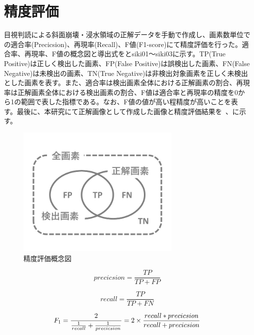 \documentclass[../Thesis]{subfiles}
\begin{document}
\section{精度評価}
目視判読による斜面崩壊・浸水領域の正解データを手動で作成し、画素数単位での適合率(Precicsion)、再現率(Recall)、F値(F1-score)にて精度評価を行った。適合率、再現率、F値の概念図と導出式をとsiki{01}～siki{03}に示す。TP(True Positive)は正しく検出した画素、FP(False Positive)は誤検出した画素、FN(False Negative)は未検出の画素、TN(True Negative)は非検出対象画素を正しく未検出とした画素を表す。また、適合率は検出画素全体における正解画素の割合、再現率は正解画素全体における検出画素の割合、F値は適合率と再現率の精度を0から1の範囲で表した指標である。なお、F値の値が高い程精度が高いことを表す。最後に、本研究にて正解画像として作成した画像と精度評価結果を~、に示す。

\begin{figure}[h]
	\centering
	\includegraphics[width=8cm]{img/evaluation.jpg}
	\caption{精度評価概念図}
	\label{img19}
\end{figure}

\begin{equation}
	precicsion = \frac{TP}{TP+FP}
\end{equation}

\begin{equation}
	recall = \frac{TP}{TP+FN}
\end{equation}

\begin{equation}
	F_1 = \frac{2}{\frac{1}{recall}+\frac{1}{precicsion}} \\
	    = 2 \times \frac{recall*precicsion}{recall+precicsion}
\end{equation}
\end{document}
